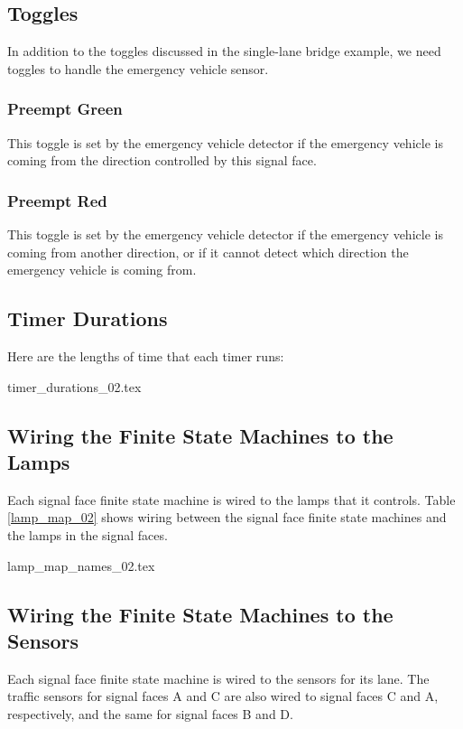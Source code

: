\documentclass[letterpaper,twoside]{article}
\begin{document}
\subsection{Toggles}

In addition to the toggles discussed in the single-lane bridge example,
we need toggles to handle the emergency vehicle sensor.

\subsubsection{Preempt Green}

This toggle is set by the emergency vehicle detector if the emergency
vehicle is coming from the direction controlled by this signal face.

\subsubsection{Preempt Red}

This toggle is set by the emergency vehicle detector if the emergency
vehicle is coming from another direction, or if it cannot detect
which direction the emergency vehicle is coming from.

\subsection{Timer Durations}

Here are the lengths of time that each timer runs:

 {timer_durations_02.tex}

\subsection{Wiring the Finite State Machines to the Lamps}

Each signal face finite state machine is wired to the lamps that
it controls.  Table \ref{lamp_map_02} shows wiring between the signal
face finite state machines and the lamps in the signal faces.

 {lamp_map_names_02.tex}

\subsection{Wiring the Finite State Machines to the Sensors}

Each signal face finite state machine is wired to the sensors
for its lane.  The traffic sensors for signal faces A and C
are also wired to signal faces C and A, respectively, and
the same for signal faces B and D.
\end{document}
